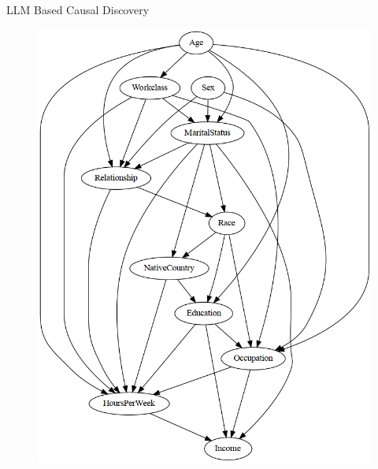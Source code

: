 \documentclass{beamer}
\begin{document}
\begin{frame}{LLM Based Causal Discovery}
	\begin{figure}
		\centering
		\includegraphics[scale=0.2]{imgs/adult_llm.png}
	\end{figure}
\end{frame}

% 
\end{document}
